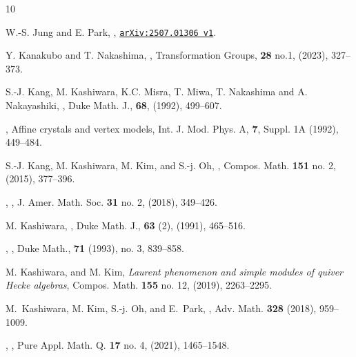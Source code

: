 \documentclass[12pt,leqno]{amsart}%
\newcommand{\arxiv}[1]{\href{http://arxiv.org/abs/#1}{\texttt{arXiv:#1}}}
\theoremstyle{plain}
\theoremstyle{definition}
\numberwithin{equation}{section}
\begin{document}
\begin{thebibliography}{10}


W.-S. Jung and E. Park, , \arxiv{2507.01306\,v1}.


Y. Kanakubo and T. Nakashima,
, Transformation Groups, {\bf 28}
no.1, (2023), 327--373.

 S.-J. Kang, M. Kashiwara, K.C. Misra, T. Miwa, { T. Nakashima} 
            and A. Nakayashiki,
            ,
           Duke Math. J., {\bf 68}, (1992), 499--607.

           \bysame,
           Affine crystals and vertex models, 
           Int. J. Mod. Phys. A, {\bf 7},
           Suppl. 1A (1992), 449--484.



S.-J. Kang, M. Kashiwara,  M. Kim,  and   S.-j. Oh,
,
Compos. Math. \textbf{151} no. 2, (2015), 377--396.



\bysame,
,
J. Amer. Math. Soc. \textbf{31} no. 2,  (2018), 349--426.

 M. Kashiwara,
,
	Duke Math. J., {\bf 63} (2), (1991), 465--516.

\bysame,
,
Duke Math., \textbf{71} (1993), no. 3, 839--858.

  M. Kashiwara, and  M. Kim,
  \emph{Laurent phenomenon and simple modules of quiver Hecke algebras}, Compos. Math. {\bf 155} no. 12, (2019), 2263--2295. 



M.~Kashiwara, M. Kim, S.-j. Oh, and  E.~Park,
,
Adv. Math. \textbf{328} (2018), 959--1009.

\bysame, , Pure Appl. Math. Q. \textbf{17} no. 4, (2021), 1465--1548.


\end{thebibliography}
\end{document}
